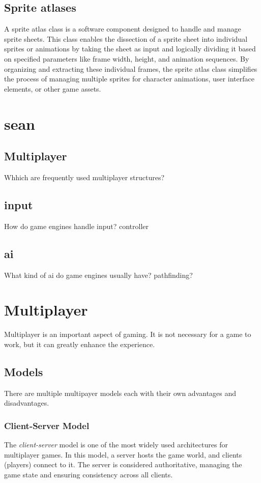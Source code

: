 \documentclass{article} %
\begin{document}
\subsection{Sprite atlases}
A sprite atlas class is a software component designed to handle and manage sprite sheets.
This class enables the dissection of a sprite sheet into individual sprites or animations by taking the sheet as input and logically dividing it based on specified parameters like frame width, height, and animation sequences.
By organizing and extracting these individual frames, the sprite atlas class simplifies the process of managing multiple sprites for character animations, user interface elements, or other game assets.

\newpage

\section{sean}
\subsection{Multiplayer}
Whhich are frequently used multiplayer structures?
\subsection{input}
How do game engines handle input?
controller
\subsection{ai}
What kind of ai do game engines usually have?
pathfinding?
\newpage

\section{Multiplayer}
Multiplayer is an important aspect of gaming. It is not necessary for a game to work, but it can greatly enhance the experience.
\subsection{Models}
There are multiple multipayer models each with their own advantages and disadvantages. \cite{Kroupp_2024}

\subsubsection{Client-Server Model}
The \textit{client-server} model is one of the most widely used architectures for multiplayer games. In this model, a server hosts the game world, and clients (players) connect to it. The server is considered authoritative, managing the game state and ensuring consistency across all clients.
\end{document}
